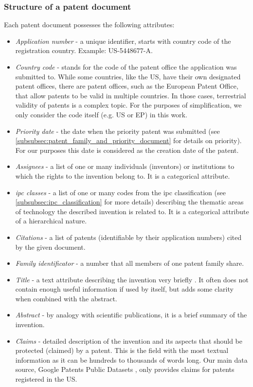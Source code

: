 \subsubsection{Structure of a patent document}
\label{subsubsec:structure_of_a_patent_document}

Each patent document possesses the following attributes:
\begin{itemize}
\item \textit{Application number} -  a unique identifier, starts with country code of the registration country. Example: US-5448677-A.
\item \textit{Country code} - stands for the code of the patent office the application was submitted to. 
While some countries, like the US, have their own designated patent offices, there are patent offices, such as the European Patent Office, that allow patents to be valid in multiple countries.
In those cases, terrestrial validity of patents is a complex topic.
For the purposes of simplification, we only consider the code itself (e.g. US or EP) in this work.
\item \textit{Priority date} - the date when the priority patent was submitted (see \autoref{subsubsec:patent_family_and_priority_document} for details on priority).
For our purposes this date is considered as the creation date of the patent.
\item \textit{Assignees} - a list of one or many individuals (inventors) or institutions to which the rights to the invention belong to. It is a categorical attribute.
\item \textit{\gls{ipc} classes} - a list of one or many codes from the \gls{ipc} classification (see \autoref{subsubsec:ipc_classification} for more details) describing the thematic areas of technology the described invention is related to. It is a categorical attribute of a hierarchical nature.
\item \textit{Citations} - a list of patents (identifiable by their application numbers) cited by the given document.
\item \textit{Family identificator} - a number that all members of one patent family share.
\item \textit{Title} - a text attribute describing the invention very briefly . It often does not contain enough useful information if used by itself, but adds some clarity when combined with the abstract.
\item \textit{Abstract} - by analogy with scientific publications, it is a brief summary of the invention.
\item \textit{Claims} - detailed description of the invention and its aspects that should be protected (claimed) by a patent.
This is the field with the most textual information as it can be hundreds to thousands of words long.
Our main data source, Google Patents Public Datasets \cite{IanWetherbee2017}, only provides claims for patents registered in the US.
\end{itemize}

